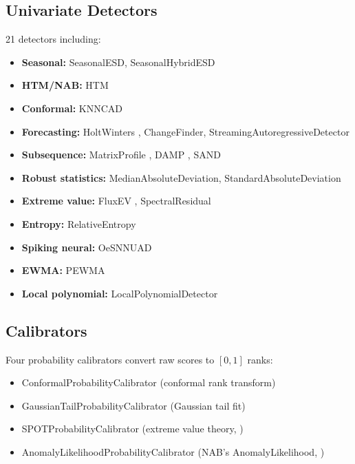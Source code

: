 \documentclass[11pt,a4paper]{article}
\begin{document}
\subsection{Univariate Detectors}
\label{sec:univariate_detectors}

21 detectors including:
\begin{itemize}
    \item \textbf{Seasonal:} SeasonalESD, SeasonalHybridESD \citep{hochenbaum2017automatic}
    \item \textbf{HTM/NAB:} HTM \citep{ahmad2017unsupervised}
    \item \textbf{Conformal:} KNNCAD \citep{burnaev2016conformalized}
    \item \textbf{Forecasting:} HoltWinters \citep{brutlag2000aberrant}, ChangeFinder, StreamingAutoregressiveDetector \citep{takeuchi2006unifying}
    \item \textbf{Subsequence:} MatrixProfile \citep{yeh2016matrix}, DAMP \citep{lu2022matrix}, SAND \citep{boniol2021sand}
    \item \textbf{Robust statistics:} MedianAbsoluteDeviation, StandardAbsoluteDeviation
    \item \textbf{Extreme value:} FluxEV \citep{li2021fluxev}, SpectralResidual \citep{ren2019time}
    \item \textbf{Entropy:} RelativeEntropy \citep{wang2011statistical}
    \item \textbf{Spiking neural:} OeSNNUAD \citep{maciag2021unsupervised}
    \item \textbf{EWMA:} PEWMA \citep{carter2012probabilistic}
    \item \textbf{Local polynomial:} LocalPolynomialDetector \citep{li2007local}
\end{itemize}

\subsection{Calibrators}
\label{sec:calibrators}

Four probability calibrators convert raw scores to $[0,1]$ ranks:
\begin{itemize}
    \item ConformalProbabilityCalibrator (conformal rank transform)
    \item GaussianTailProbabilityCalibrator (Gaussian tail fit)
    \item SPOTProbabilityCalibrator (extreme value theory, \citealp{siffer2017anomaly})
    \item AnomalyLikelihoodProbabilityCalibrator (NAB's AnomalyLikelihood, \citealp{ahmad2017unsupervised})
\end{itemize}
\end{document}
